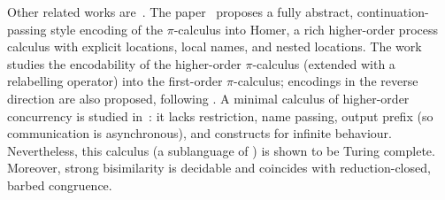 Other related works are~\cite{BundgaardHG06,XuActa2012,DBLP:journals/iandc/LanesePSS11}.
The paper~\cite{BundgaardHG06} proposes a fully abstract, continuation-passing style encoding of the 
$\pi$-calculus into Homer, a rich higher-order process calculus with explicit locations, local names, and nested locations.
The work~\cite{XuActa2012} studies the encodability of the higher-order $\pi$-calculus (extended with a relabelling operator) into the first-order $\pi$-calculus; encodings in the reverse direction are also proposed, following \cite{Tho90}.
A minimal calculus of higher-order concurrency is studied in~\cite{DBLP:journals/iandc/LanesePSS11}: it lacks restriction,  name passing, output prefix (so  communication is asynchronous), and constructs for infinite behaviour. 
Nevertheless, this calculus (a sublanguage of \HO) is shown to be Turing complete. Moreover, 
strong bisimilarity is decidable and coincides with reduction-closed, barbed congruence. 

